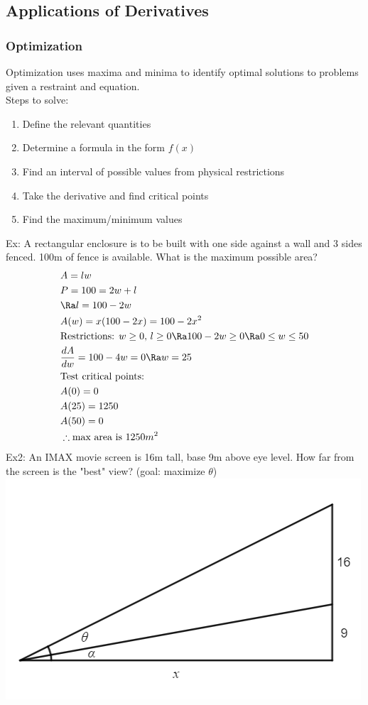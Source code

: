 \subsection{Applications of Derivatives}

\subsubsection{Optimization}
Optimization uses maxima and minima to identify optimal solutions to problems given a restraint and equation.\\
Steps to solve:
\begin{enumerate}
    \item Define the relevant quantities
    \item Determine a formula in the form $f(x)$
    \item Find an interval of possible values from physical restrictions
    \item Take the derivative and find critical points
    \item Find the maximum/minimum values
\end{enumerate}
Ex: A rectangular enclosure is to be built with one side against a wall and 3 sides fenced. 100m of fence is available. What is the maximum possible area?
\begin{align*}
    &A=lw\\
    &P=100=2w+l\\
    &\Ra l=100-2w\\
    &A(w)=x(100-2x)=100-2x^2\\
    &\text{Restrictions: }w\geq 0,\, l\geq 0\Ra 100-2w\geq 0\Ra 0\leq w\leq 50\\
    &\frac{dA}{dw}=100-4w=0\Ra w=25\\
    &\text{Test critical points: }\\
    &A(0)=0\\
    &A(25)=1250\\
    &A(50)=0\\
    &\therefore \text{max area is }1250m^2
\end{align*}
Ex2: An IMAX movie screen is 16m tall, base 9m above eye level. How far from the screen is the "best" view? (goal: maximize $\theta$)\\
\includegraphics[scale=0.8]{Images/DifferentialCalculusPictures/OptimizationEx.png}
